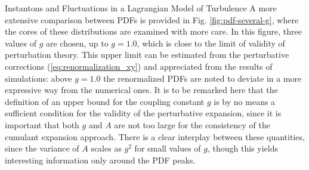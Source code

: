 \begin{chapter}{Instantons and Fluctuations in a Lagrangian Model of Turbulence}
A more extensive comparison between PDFs is provided in Fig. \ref{fig:pdf-several-g}, where the cores of these distributions are examined with more care. In this figure, three values of $g$ are chosen, up to $g=1.0$, which is close to the limit of validity of perturbation theory. 
This upper limit can be estimated from the perturbative corrections (\ref{eq:renormalization_xy}) and appreciated from the results of simulations: above $g=1.0$ the renormalized PDFs are noted to deviate in a more expressive way from the numerical ones.
It is to be remarked here that the definition of an upper bound for the coupling constant $g$ is by no means a sufficient condition for the 
validity of the perturbative expansion, since it is important that both $g$ and $A$ are not too large for the consistency of the cumulant expansion approach.
There is a clear interplay between these quantities, since the variance of $A$ scales as $g^2$ for small values of $g$, though this yields interesting information only around the PDF peaks. 


\end{chapter}
